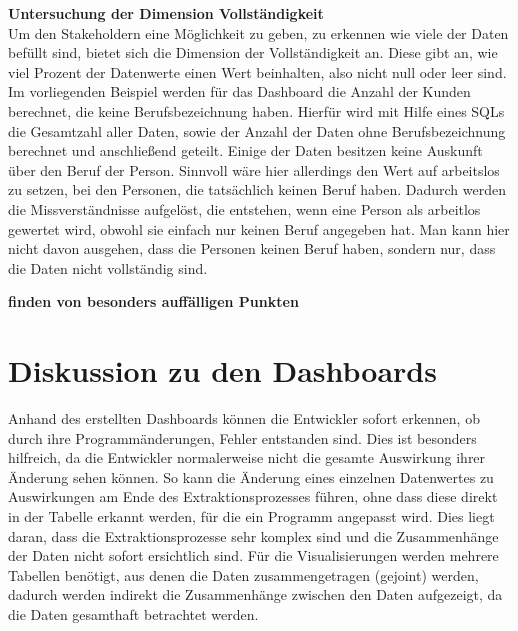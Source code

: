 \textbf{Untersuchung der Dimension Vollständigkeit} \\
Um den Stakeholdern eine Möglichkeit zu geben, zu erkennen wie viele der Daten befüllt sind, bietet sich die Dimension der Vollständigkeit an.
Diese gibt an, wie viel Prozent der Datenwerte einen Wert beinhalten, also nicht null oder leer sind. 
Im vorliegenden Beispiel werden für das Dashboard die Anzahl der Kunden berechnet, die keine Berufsbezeichnung haben. 
Hierfür wird mit Hilfe eines SQLs die Gesamtzahl aller Daten, sowie der Anzahl der Daten ohne Berufsbezeichnung berechnet und anschließend geteilt. 
Einige der Daten besitzen keine Auskunft über den Beruf der Person. 
Sinnvoll wäre hier allerdings den Wert auf arbeitslos zu setzen, bei den Personen, die tatsächlich keinen Beruf haben. 
Dadurch werden die Missverständnisse aufgelöst, die entstehen, wenn eine Person als arbeitlos gewertet wird, obwohl sie einfach nur keinen Beruf angegeben hat. 
Man kann hier nicht davon ausgehen, dass die Personen keinen Beruf haben, sondern nur, dass die Daten nicht vollständig sind.











\textbf{finden von besonders auffälligen Punkten}




\section{Diskussion zu den Dashboards}
Anhand des erstellten Dashboards können die Entwickler sofort erkennen, ob durch ihre Programmänderungen, Fehler entstanden sind. 
Dies ist besonders hilfreich, da die Entwickler normalerweise nicht die gesamte Auswirkung ihrer Änderung sehen können. 
So kann die Änderung eines einzelnen Datenwertes zu Auswirkungen am Ende des Extraktionsprozesses führen, ohne dass diese direkt in der Tabelle erkannt werden, für die ein Programm angepasst wird.
Dies liegt daran, dass die Extraktionsprozesse sehr komplex sind und die Zusammenhänge der Daten nicht sofort ersichtlich sind. 
Für die Visualisierungen werden mehrere Tabellen benötigt, aus denen die Daten zusammengetragen (gejoint) werden, dadurch werden indirekt die Zusammenhänge zwischen den Daten aufgezeigt, da die Daten gesamthaft betrachtet werden. 

